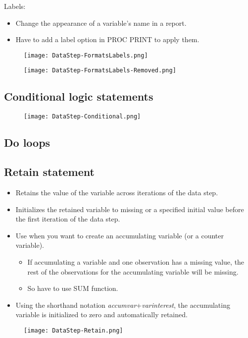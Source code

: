 \documentclass[11pt, oneside]{article}
\begin{document}
Labels:
\begin{itemize}
	\item Change the appearance of a variable's name in a report.
	\item Have to add a label option in PROC PRINT to apply them.
\end{itemize}


\begin{figure}[H]
\texttt{[image: DataStep-FormatsLabels.png]}
\end{figure}

\begin{figure}[H]
\texttt{[image: DataStep-FormatsLabels-Removed.png]}
\end{figure}

\subsection{Conditional logic statements}



\begin{figure}[H]
\texttt{[image: DataStep-Conditional.png]}
\end{figure}

\subsection{Do loops}



\subsection{Retain statement}

\begin{itemize}
\item Retains the value of the variable across iterations of the data step.
\item Initializes the retained variable to missing or a specified initial value before the first iteration of the data step.
\item Use when you want to create an accumulating variable (or a counter variable).
	\begin{itemize}
	\item If accumulating a variable and one observation has a missing value, the rest of the observations for the accumulating variable will be missing.
	\item So have to use SUM function.
	\end{itemize}
\item Using the shorthand notation \textit{accumvar}+\textit{varinterest}, the accumulating variable is initialized to zero and automatically retained.
\end{itemize}


\begin{figure}[H]
\texttt{[image: DataStep-Retain.png]}
\end{figure}
\end{document}
